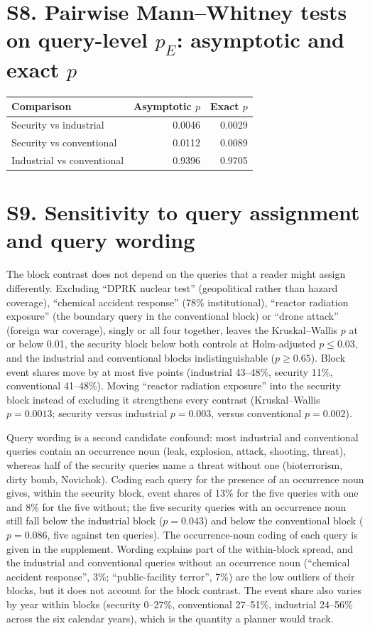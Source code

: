 \documentclass[11pt]{article}
\begin{document}
\section*{S8. Pairwise Mann--Whitney tests on query-level $p_E$: asymptotic and exact $p$}
\begin{tabular}{lrr}\toprule Comparison & Asymptotic $p$ & Exact $p$ \\\midrule
Security vs industrial & 0.0046 & 0.0029 \\
Security vs conventional & 0.0112 & 0.0089 \\
Industrial vs conventional & 0.9396 & 0.9705 \\
\bottomrule\end{tabular}

\section*{S9. Sensitivity to query assignment and query wording}
The block contrast does not depend on the queries that a reader might assign differently. Excluding ``DPRK nuclear test'' (geopolitical rather than hazard coverage), ``chemical accident response'' (78\% institutional), ``reactor radiation exposure'' (the boundary query in the conventional block) or ``drone attack'' (foreign war coverage), singly or all four together, leaves the Kruskal--Wallis $p$ at or below 0.01, the security block below both controls at Holm-adjusted $p \le 0.03$, and the industrial and conventional blocks indistinguishable ($p \ge 0.65$). Block event shares move by at most five points (industrial 43--48\%, security 11\%, conventional 41--48\%). Moving ``reactor radiation exposure'' into the security block instead of excluding it strengthens every contrast (Kruskal--Wallis $p = 0.0013$; security versus industrial $p = 0.003$, versus conventional $p = 0.002$).

Query wording is a second candidate confound: most industrial and conventional queries contain an occurrence noun (leak, explosion, attack, shooting, threat), whereas half of the security queries name a threat without one (bioterrorism, dirty bomb, Novichok). Coding each query for the presence of an occurrence noun gives, within the security block, event shares of 13\% for the five queries with one and 8\% for the five without; the five security queries with an occurrence noun still fall below the industrial block ($p = 0.043$) and below the conventional block ($p = 0.086$, five against ten queries). The occurrence-noun coding of each query is given in the supplement. Wording explains part of the within-block spread, and the industrial and conventional queries without an occurrence noun (``chemical accident response'', 3\%; ``public-facility terror'', 7\%) are the low outliers of their blocks, but it does not account for the block contrast. The event share also varies by year within blocks (security 0--27\%, conventional 27--51\%, industrial 24--56\% across the six calendar years), which is the quantity a planner would track.
\end{document}
